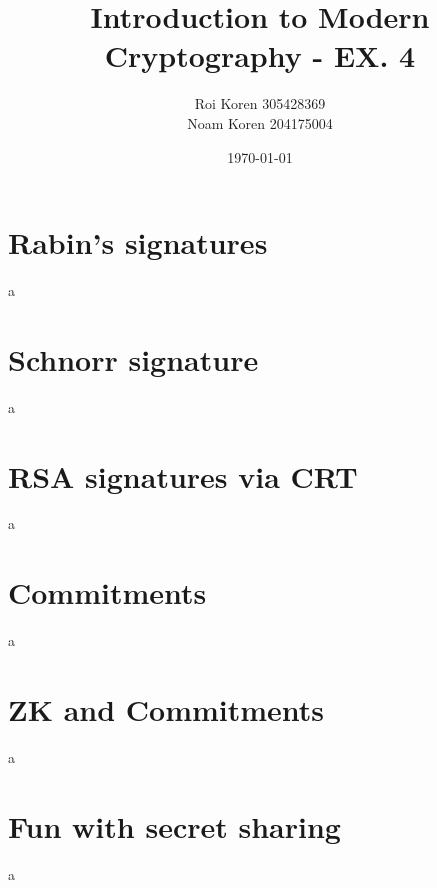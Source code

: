 \documentclass{article}
\begin{document}
\title{Introduction to Modern Cryptography - EX. 4}
\author{Roi Koren 305428369\\ Noam Koren 204175004}
\date{\today}
\maketitle
\newpage
{}

\section{Rabin's signatures}
\quad a 

\section{Schnorr signature}
\quad a 

\section{RSA signatures via CRT}
\quad a 

\section{Commitments}
\quad a

\section{ZK and Commitments}
\quad a

\section{Fun with secret sharing}
\quad a
\end{document}

